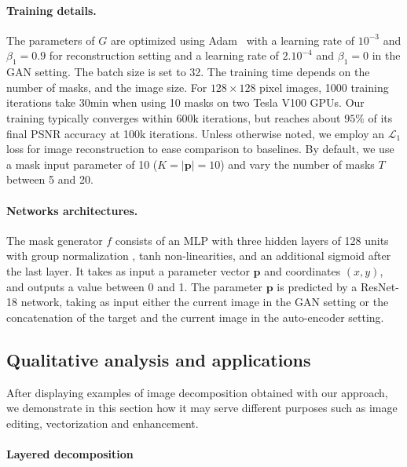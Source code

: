 \documentclass[10pt,twocolumn,letterpaper]{article}
\begin{document}
\paragraph{Training details.}
The parameters of $G$ are optimized using Adam~\cite{kingma2014adam} with a learning rate of $10^{-3}$ and $\beta_1=0.9$ for reconstruction setting and a learning rate of $2.10^{-4}$ and $\beta_1=0$ in the GAN setting. The batch size is set to 32. 
The training time depends on the number of masks, and the image size. 
For $128\times128$ pixel images, 1000 training iterations take 30min when using 10 masks on two Tesla V100 GPUs. Our training typically converges within 600k iterations, but reaches about $95\%$ of its final PSNR accuracy at 100k iterations.
Unless otherwise noted, we employ an $\mathcal{L}_1$ loss for image reconstruction to ease comparison to baselines. By default, we use a mask input parameter of 10 ($K = |\mathbf{p}| = 10$) and vary the number of masks $T$ between 5 and 20.

\paragraph{Networks architectures.} 
The mask generator $f$ consists of an MLP with three hidden layers of 128 units with group normalization \cite{wu2018group}, tanh non-linearities, and an additional sigmoid after the last layer. It takes as input a parameter vector $\mathbf{p}$ and coordinates $(x,y)$, and outputs a value between 0 and 1. The parameter $\mathbf{p}$ is predicted by a ResNet-18 network, taking as input either the current image in the GAN setting or the concatenation of the target and the current image in the auto-encoder setting.


\subsection{Qualitative analysis and applications}

After displaying examples of image decomposition obtained with our approach, we demonstrate in this section how it may serve different purposes such as image editing, vectorization and enhancement.


\paragraph{Layered decomposition}
\end{document}
